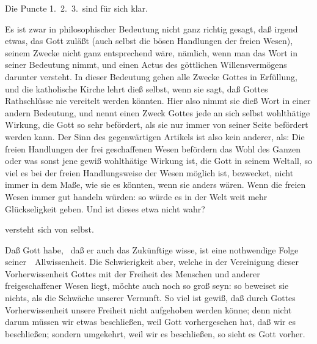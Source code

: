 Die Puncte 1.\ 2.\ 3.\ sind für sich klar.
\begin{aufza}
\item Es ist zwar in philosophischer Bedeutung nicht ganz richtig gesagt, daß irgend etwas, das Gott zuläßt (auch selbst die bösen Handlungen der freien Wesen), seinem Zwecke nicht ganz entsprechend wäre, nämlich, wenn man das Wort  in seiner  Bedeutung nimmt, und einen Actus des göttlichen Willensvermögens darunter versteht. In dieser Bedeutung gehen alle Zwecke Gottes in Erfüllung, und die katholische Kirche lehrt dieß selbst, wenn sie sagt, daß Gottes Rathschlüsse nie vereitelt werden könnten. Hier also nimmt sie dieß Wort in einer andern Bedeutung, und nennt einen Zweck Gottes jede an sich selbst wohlthätige Wirkung, die Gott so sehr befördert, als sie nur immer von seiner Seite befördert werden kann. Der Sinn des gegenwärtigen Artikels ist also kein anderer, als: Die freien Handlungen der frei geschaffenen Wesen befördern das Wohl des Ganzen oder was sonst jene gewiß wohlthätige Wirkung ist, die Gott in seinem Weltall, so viel es bei der freien Handlungsweise der Wesen möglich ist, bezwecket, nicht immer in dem Maße, wie sie es könnten, wenn sie anders wären. Wenn die freien Wesen immer gut handeln würden: so würde es in der Welt weit mehr Glückseligkeit geben. Und ist dieses etwa nicht wahr?
\item versteht sich von selbst.
\item Daß Gott  habe, \dh\ daß er auch das Zukünftige wisse, ist eine nothwendige Folge seiner~\ Allwissenheit. Die Schwierigkeit aber, welche in der Vereinigung dieser Vorherwissenheit Gottes mit der Freiheit des Menschen und anderer freigeschaffener Wesen liegt, möchte auch noch so groß seyn: so beweiset sie nichts, als die Schwäche unserer Vernunft. So viel ist gewiß, daß durch Gottes Vorherwissenheit unsere Freiheit nicht aufgehoben werden könne; denn nicht darum müssen wir etwas beschließen, weil Gott vorhergesehen hat, daß wir es beschließen; sondern umgekehrt, weil wir es beschließen, so sieht es Gott vorher.
\end{aufza}

